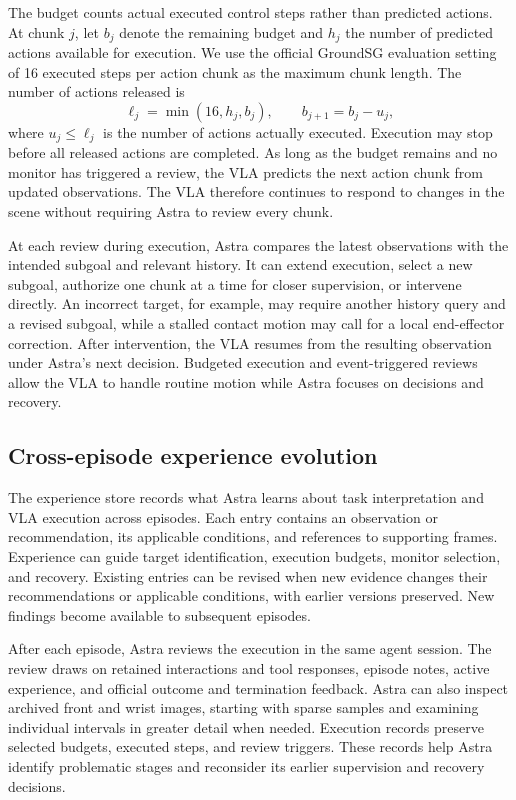 The budget counts actual executed control steps rather than predicted actions. At chunk $j$, let $b_j$ denote the remaining budget and $h_j$ the number of predicted actions available for execution. We use the official GroundSG evaluation setting of 16 executed steps per action chunk as the maximum chunk length. The number of actions released is
\begin{equation}
 \ell_j=\min(16,h_j,b_j),\qquad b_{j+1}=b_j-u_j,
 \label{eq:budget}
\end{equation}
where $u_j\leq\ell_j$ is the number of actions actually executed. Execution may stop before all released actions are completed. As long as the budget remains and no monitor has triggered a review, the VLA predicts the next action chunk from updated observations. The VLA therefore continues to respond to changes in the scene without requiring Astra to review every chunk.

At each review during execution, Astra compares the latest observations with the intended subgoal and relevant history. It can extend execution, select a new subgoal, authorize one chunk at a time for closer supervision, or intervene directly. An incorrect target, for example, may require another history query and a revised subgoal, while a stalled contact motion may call for a local end-effector correction. After intervention, the VLA resumes from the resulting observation under Astra's next decision. Budgeted execution and event-triggered reviews allow the VLA to handle routine motion while Astra focuses on decisions and recovery.

\subsection{Cross-episode experience evolution}

The experience store records what Astra learns about task interpretation and VLA execution across episodes. Each entry contains an observation or recommendation, its applicable conditions, and references to supporting frames. Experience can guide target identification, execution budgets, monitor selection, and recovery. Existing entries can be revised when new evidence changes their recommendations or applicable conditions, with earlier versions preserved. New findings become available to subsequent episodes.

After each episode, Astra reviews the execution in the same agent session. The review draws on retained interactions and tool responses, episode notes, active experience, and official outcome and termination feedback. Astra can also inspect archived front and wrist images, starting with sparse samples and examining individual intervals in greater detail when needed. Execution records preserve selected budgets, executed steps, and review triggers. These records help Astra identify problematic stages and reconsider its earlier supervision and recovery decisions.

